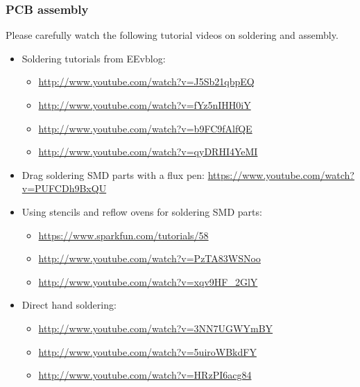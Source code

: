 \documentclass[letterpaper, 11pt]{article}
\begin{document}
\subsubsection{PCB assembly}
Please carefully watch the following tutorial videos on soldering and assembly. 
\begin{itemize}
	\item Soldering tutorials from EEvblog:
		\begin{itemize}
			\item \url{http://www.youtube.com/watch?v=J5Sb21qbpEQ}
			\item \url{http://www.youtube.com/watch?v=fYz5nIHH0iY}
			\item \url{http://www.youtube.com/watch?v=b9FC9fAlfQE}
			\item \url{http://www.youtube.com/watch?v=qyDRHI4YeMI}
		\end{itemize}
	\item Drag soldering SMD parts with a flux pen: \url{https://www.youtube.com/watch?v=PUFCDh9BxQU}
	
	\item Using stencils and reflow ovens for soldering SMD parts:
		\begin{itemize}
			\item \url{https://www.sparkfun.com/tutorials/58}
			\item \url{http://www.youtube.com/watch?v=PzTA83WSNoo}
			\item \url{http://www.youtube.com/watch?v=xqv9HF_2GlY } 
		\end{itemize}
	 \item Direct hand soldering:
		 \begin{itemize}
			 \item \url{http://www.youtube.com/watch?v=3NN7UGWYmBY}
			 \item \url{http://www.youtube.com/watch?v=5uiroWBkdFY}
			 \item \url{http://www.youtube.com/watch?v=HRzPI6acg84}
		 \end{itemize}
\end{itemize}
\end{document}
